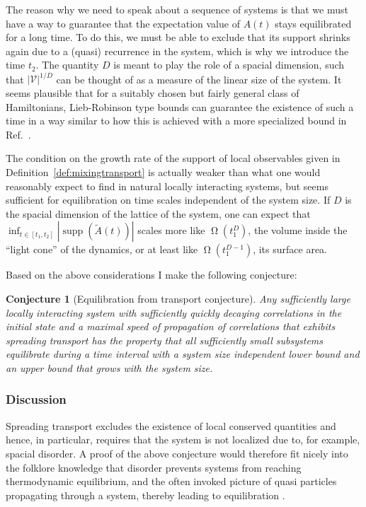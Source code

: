 \documentclass[a4paper,12pt,listof=totoc,index=totoc,bibliography=totoc,headsepline=false,headings=normal,BCOR16.153846mm,DIV12,headinclude,twoside,cleardoublepage=empty,numbers=noenddot,final]{scrreprt}
\theoremstyle{mystyle}
\numberwithin{equation}{section}
\numberwithin{figure}{section}
\numberwithin{lemma}{section}
\numberwithin{theorem}{section}
\numberwithin{corollary}{section}
\numberwithin{definition}{section}
\newtheorem{conjecture}{Conjecture}
\numberwithin{conjecture}{section}
\numberwithin{observation}{section}
\newcommand{\+}{\mkern2mu}
\newcommand{\Vset}{\mathcal{V}}
\DeclareMathOperator{\landauOmega}{\Omega}
\DeclareMathOperator{\1}{\mathds{1}}
\DeclareMathOperator{\supp}{supp}
\begin{document}
The reason why we need to speak about a sequence of systems is that we must have a way to guarantee that the expectation value of $A(t)$ stays equilibrated for a long time.
To do this, we must be able to exclude that its support shrinks again due to a (quasi) recurrence in the system, which is why we introduce the time $t_2$.
The quantity $D$ is meant to play the role of a spacial dimension, such that $|\Vset|^{1/D}$ can be thought of as a measure of the linear size of the system.
It seems plausible that for a suitably chosen but fairly general class of Hamiltonians, Lieb-Robinson type bounds can guarantee the existence of such a time in a way similar to how this is achieved with a more specialized bound in Ref.~\cite{cramer10_1}.

The condition on the growth rate of the support of local observables given in Definition~\ref{def:mixingtransport} is actually weaker than what one would reasonably expect to find in natural locally interacting systems, but seems sufficient for equilibration on time scales independent of the system size.
If $D$ is the spacial dimension of the lattice of the system, one can expect that $\inf_{t \in [t_1,t_2]} |\supp(\tilde{A}(t))|$ scales more like $\landauOmega(t_1^D)$, the volume inside the ``light cone'' of the dynamics, or at least like $\landauOmega(t_1^{D-1})$, its surface area.

Based on the above considerations I make the following conjecture:
\begin{conjecture}[Equilibration from transport conjecture] \label{conj:equilibrationfromtransportconjecture}
  Any sufficiently large locally interacting system with sufficiently quickly decaying correlations in the initial state and a maximal speed of propagation of correlations that exhibits \emph{spreading transport} has the property that all sufficiently small subsystems equilibrate during a time interval with a system size independent lower bound and an upper bound that grows with the system size.
\end{conjecture}


\subsubsection*{Discussion}
%
Spreading transport excludes the existence of local conserved quantities and hence, in particular, requires that the system is not localized due to, for example, spacial disorder. 
A proof of the above conjecture would therefore fit nicely into the folklore knowledge that disorder prevents systems from reaching thermodynamic equilibrium, and the often invoked picture of quasi particles propagating through a system, thereby leading to equilibration \cite{Calabrese2007}.
\end{document}
